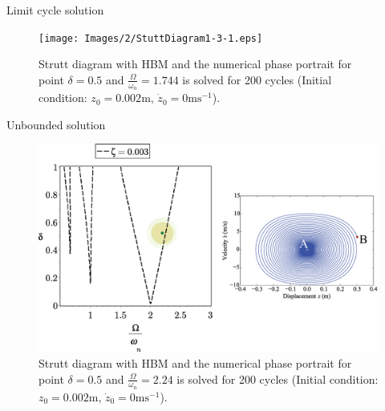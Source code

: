 \documentclass[LaTeX2e,10pt]{beamer}
\begin{document}
\begin{frame}{Limit cycle solution}
\begin{figure}
	\centering
	\texttt{[image: Images/2/StuttDiagram1-3-1.eps]}
	\caption{Strutt diagram with HBM and the numerical phase portrait for point $\delta = 0.5$ and $\frac{\Omega}{\omega_n} = 1.744$ is solved for 200 cycles (Initial condition: $z_0 = 0.002 \mathrm{m}$, $\dot{z}_0 = 0 \mathrm{ms^{-1}}$).}
\end{figure}
\end{frame}

\begin{frame}{Unbounded solution}
\begin{figure}
	\centering
	\includegraphics[width=\linewidth]{Images/2/StuttDiagram1-4-1.eps}
	\caption{Strutt diagram with HBM and the numerical phase portrait for point $\delta = 0.5$ and $\frac{\Omega}{\omega_n} = 2.24 $ is solved for 200 cycles (Initial condition: $z_0 = 0.002 \mathrm{m}$, $\dot{z}_0 = 0 \mathrm{ms^{-1}}$).}%
\end{figure}
\end{frame}
\end{document}
